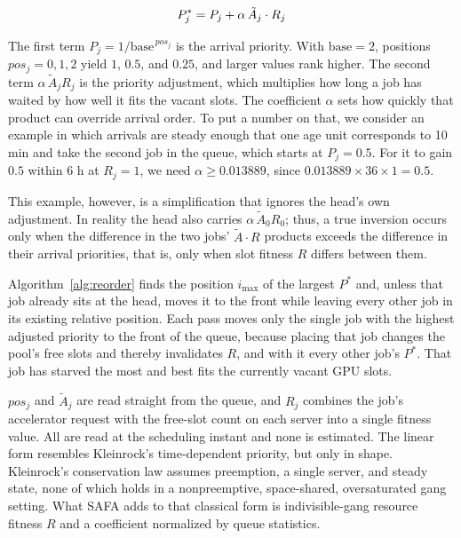 \documentclass{ieeetj}
\begin{document}
\begin{equation}
P^*_j = P_j + \alpha\, \tilde A_j \cdot R_j
\label{eq:01}
\vspace{2pt}
\end{equation}

The first term $P_j=1/\text{base}^{\,pos_j}$ is the arrival priority. With $\text{base}=2$, positions $pos_j=0,1,2$ yield $1$, $0.5$, and $0.25$, and larger values rank higher. The second term $\alpha\,\tilde A_j R_j$ is the priority adjustment, which multiplies how long a job has waited by how well it fits the vacant slots. The coefficient $\alpha$ sets how quickly that product can override arrival order. To put a number on that, we consider an example in which arrivals are steady enough that one age unit corresponds to 10 min and take the second job in the queue, which starts at $P_j=0.5$. For it to gain $0.5$ within 6 h at $R_j=1$, we need $\alpha\ge0.013889$, since $0.013889\times36\times1=0.5$.

This example, however, is a simplification that ignores the head's own adjustment. In reality the head also carries $\alpha\,\tilde A_0 R_0$; thus, a true inversion occurs only when the difference in the two jobs' $\tilde A\cdot R$ products exceeds the difference in their arrival priorities, that is, only when slot fitness $R$ differs between them.

Algorithm~\ref{alg:reorder} finds the position $i_{\max}$ of the largest $P^*$ and, unless that job already sits at the head, moves it to the front while leaving every other job in its existing relative position. Each pass moves only the single job with the highest adjusted priority to the front of the queue, because placing that job changes the pool's free slots and thereby invalidates $R$, and with it every other job's $P^*$. That job has starved the most and best fits the currently vacant GPU slots.

$pos_j$ and $\tilde A_j$ are read straight from the queue, and $R_j$ combines the job's accelerator request with the free-slot count on each server into a single fitness value. All are read at the scheduling instant and none is estimated. The linear form resembles Kleinrock's time-dependent priority\cite{kleinrock1976queueing}, but only in shape. Kleinrock's conservation law assumes preemption, a single server, and steady state, none of which holds in a nonpreemptive, space-shared, oversaturated gang setting. What SAFA adds to that classical form is indivisible-gang resource fitness $R$ and a coefficient normalized by queue statistics.
\end{document}
